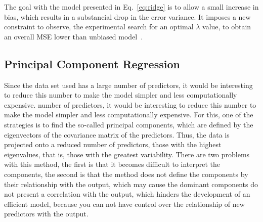 The goal with the model presented in Eq.~\ref{eq:ridge} is to allow a small increase in bias, which results in a substancial drop in the error variance. It imposes a new constraint to observe, the experimental search for an optimal $\lambda$ value, to obtain an overall MSE lower than unbiased model~\cite{James2013, Kuhn2013}.

\subsection{Principal Component Regression}
Since the data set used has a large number of predictors, it would be interesting to reduce this number to make the model simpler and less computationally expensive.
number of predictors, it would be interesting to reduce this number to make the model simpler and less computationally expensive. For this, one of the strategies is to find the so-called principal components, which are defined by the eigenvectors of the covariance matrix of the predictors. Thus, the data is projected onto a reduced number of predictors, those with the highest eigenvalues, that is, those with the greatest variability. There are two problems with this method, the first is that it becomes difficult to interpret the components, the second is that the method does not define the components by their relationship with the output, which may cause the dominant components do not present a correlation with the output, which hinders the development of an efficient model, because you can not have control over the relationship of new predictors with the output.

